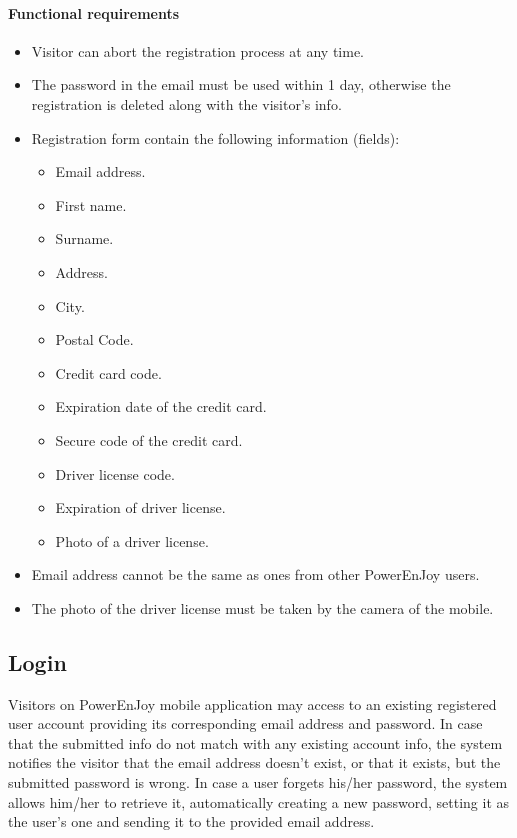 \paragraph{Functional requirements }
\begin{itemize}
	\item Visitor can abort the registration process at any time.
	\item The password in the email must be used within 1 day, otherwise the registration is deleted along with the visitor's info.
	\item Registration form contain the following information (fields):
	\begin{itemize}
		\item Email address.
		\item First name.
		\item Surname.
		\item Address.
		\item City.
		\item Postal Code.
		\item Credit card code.
		\item Expiration date of the credit card.
		\item Secure code of the credit card.
		\item Driver license code.
		\item Expiration of driver license.
		\item Photo of a driver license.
	\end{itemize}
	\item Email address cannot be the same as ones from other PowerEnJoy users.
	\item The photo of the driver license must be taken by the camera of the mobile.
\end{itemize}

\subsection{Login}
Visitors on PowerEnJoy mobile application may access to an existing registered user account providing its corresponding email address and password. In case that the submitted info do not match with any existing account info, the system notifies the visitor that the email address doesn't exist, or that it exists, but the submitted password is wrong. In case a user forgets his/her password, the system allows him/her to retrieve it, automatically creating a new password, setting it as the user's one and sending it to the provided email address.
